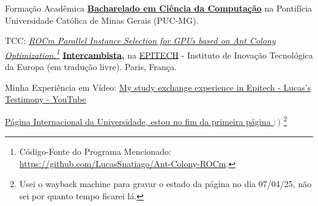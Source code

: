 \begin{rubric}{Formação Acadêmica}
\entry*[2019 -- 2023]%
    \textbf{\href{https://drive.google.com/file/d/1c2m8jONNZnZUBY8lnjcAZ_gO1ZWcIsyu/view?usp=sharing}{Bacharelado em Ciência da Computação}} na Pontifícia Universidade Católica de Minas Gerais (PUC-MG).
    \par TCC: \emph{\href{https://media.githubusercontent.com/media/LucasSnatiago/TCC/main/main.pdf}
    {ROCm Parallel Instance Selection for GPUs based on Ant Colony Optimization.}\footnote{Código-Fonte do Programa Mencionado: \href{https://github.com/LucasSnatiago/Ant-Colony-ROCm}{https://github.com/LucasSnatiago/Ant-Colony-ROCm}.}}
%
\entry*[2023/1]%
    \textbf{\href{https://drive.google.com/file/d/18yGVDfS8qOwmM7TXN-m8jqI3r0iMvm-3/view?usp=sharing}{Intercambista},} na \href{https://epitech.eu/}{EPITECH} - Instituto de Inovação Tecnológica da Europa (em tradução livre). Paris, França. \par
    Minha Experiência em Vídeo: \href{https://youtu.be/rOP5lxGcNaE}{My study exchange experience in Epitech - Lucas's Testimony - YouTube} \par
    \href{https://web.archive.org/web/20250407145959/https://international.epitech.eu/#h-voices-of-our-international-students}{Página Internacional da Universidade, estou no fim da primeira página $:)$}
    \footnote{Usei o wayback machine para gravar o estado da página no dia 07/04/25, não sei por quanto tempo ficarei lá.}
%
\end{rubric}
